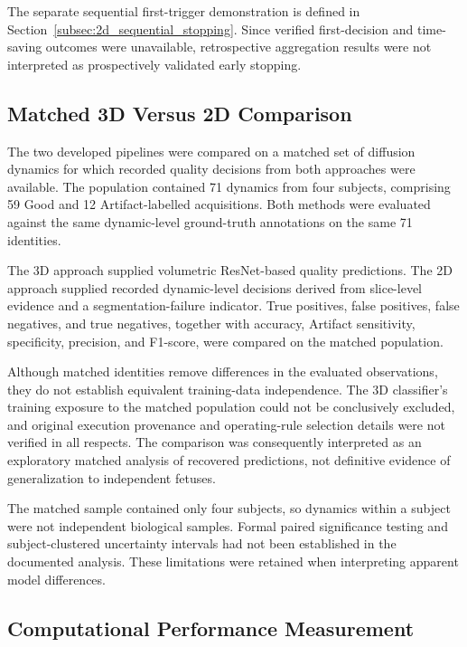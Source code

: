 The separate sequential first-trigger demonstration is defined in Section~\ref{subsec:2d_sequential_stopping}. Since verified first-decision and time-saving outcomes were unavailable, retrospective aggregation results were not interpreted as prospectively validated early stopping.

\subsection{Matched 3D Versus 2D Comparison}
\label{subsec:matched-3d-2d-evaluation}

The two developed pipelines were compared on a matched set of diffusion dynamics for which recorded quality decisions from both approaches were available. The population contained 71 dynamics from four subjects, comprising 59 Good and 12 Artifact-labelled acquisitions. Both methods were evaluated against the same dynamic-level ground-truth annotations on the same 71 identities.

The 3D approach supplied volumetric ResNet-based quality predictions. The 2D approach supplied recorded dynamic-level decisions derived from slice-level evidence and a segmentation-failure indicator. True positives, false positives, false negatives, and true negatives, together with accuracy, Artifact sensitivity, specificity, precision, and F1-score, were compared on the matched population.

Although matched identities remove differences in the evaluated observations, they do not establish equivalent training-data independence. The 3D classifier's training exposure to the matched population could not be conclusively excluded, and original execution provenance and operating-rule selection details were not verified in all respects. The comparison was consequently interpreted as an exploratory matched analysis of recovered predictions, not definitive evidence of generalization to independent fetuses.

The matched sample contained only four subjects, so dynamics within a subject were not independent biological samples. Formal paired significance testing and subject-clustered uncertainty intervals had not been established in the documented analysis. These limitations were retained when interpreting apparent model differences.

\subsection{Computational Performance Measurement}
\label{subsec:computational-evaluation}

